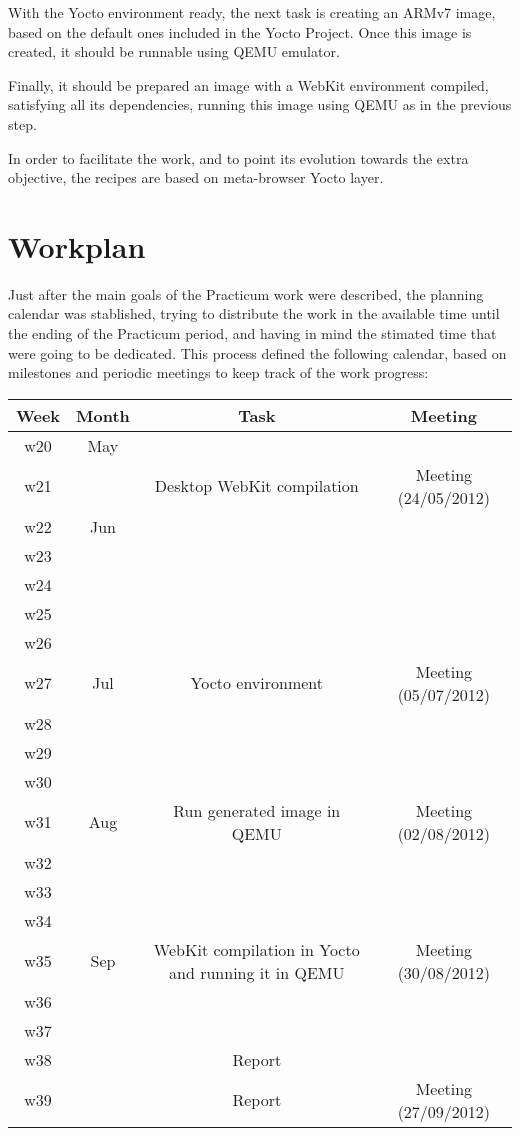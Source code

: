 \documentclass[a4paper,11pt,openany]{report}
\begin{document}
With the Yocto environment ready, the next task is creating an ARMv7 image, based on the default ones included in the Yocto Project. Once this image is created, it should be runnable using QEMU emulator.

Finally, it should be prepared an image with a WebKit environment compiled, satisfying all its dependencies, running this image using QEMU as in the previous step.

In order to facilitate the work, and to point its evolution towards the extra objective, the recipes are based on meta-browser Yocto layer.

\section{Workplan}
Just after the main goals of the Practicum work were described, the planning calendar was stablished, trying to distribute the work in the available time until the ending of the Practicum period, and having in mind the stimated time that were going to be dedicated.
This process defined the following calendar, based on milestones and periodic meetings to keep track of the work progress:

\begin{tabular}{|c|c|c|c|}
\hline 
Week & Month & Task & Meeting \\ 
\hline 
w20 & May &  &  \\ 
\hline 
w21 &  & Desktop WebKit compilation & Meeting (24/05/2012) \\ 
\hline 
w22 & Jun &  &  \\ 
\hline 
w23 &  &  &  \\ 
\hline 
w24 &  &  &  \\ 
\hline 
w25 &  &  &  \\ 
\hline 
w26 &  &  &  \\ 
\hline 
w27 & Jul & Yocto environment & Meeting (05/07/2012) \\ 
\hline 
w28 &  &  &  \\ 
\hline 
w29 &  &  &  \\ 
\hline 
w30 &  &  &  \\ 
\hline 
w31 & Aug & Run generated image in QEMU & Meeting (02/08/2012) \\ 
\hline 
w32 &  &  &  \\ 
\hline 
w33 &  &  &  \\ 
\hline 
w34 &  &  &  \\ 
\hline 
w35 & Sep & \parbox[t]{5cm}{WebKit compilation in Yocto and running it in QEMU} & Meeting (30/08/2012) \\ 
\hline 
w36 &  &  &  \\ 
\hline 
w37 &  &  &  \\ 
\hline 
w38 &  & Report &  \\ 
\hline 
w39 &  & Report & Meeting (27/09/2012) \\ 
\hline 
\end{tabular} 
\end{document}
